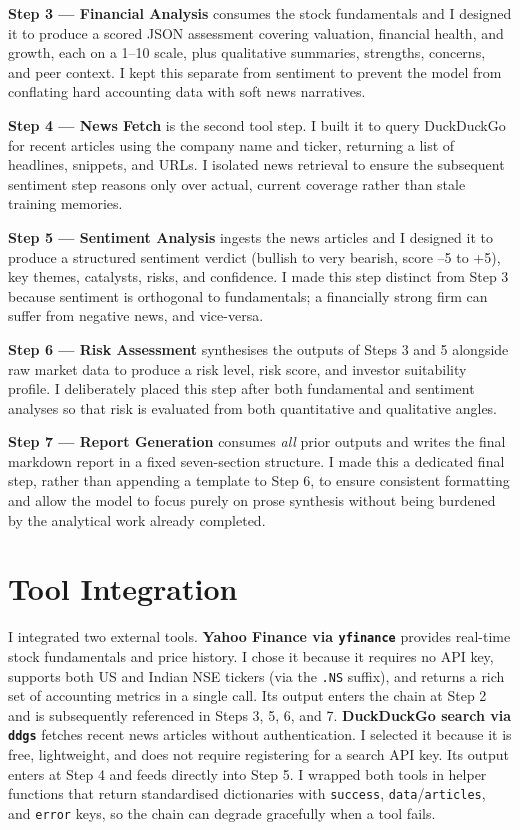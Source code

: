 \documentclass[11pt,a4paper]{article}
\begin{document}
\textbf{Step 3 --- Financial Analysis} consumes the stock fundamentals and I designed it to produce a scored JSON assessment covering valuation, financial health, and growth, each on a 1--10 scale, plus qualitative summaries, strengths, concerns, and peer context. I kept this separate from sentiment to prevent the model from conflating hard accounting data with soft news narratives.

\textbf{Step 4 --- News Fetch} is the second tool step. I built it to query DuckDuckGo for recent articles using the company name and ticker, returning a list of headlines, snippets, and URLs. I isolated news retrieval to ensure the subsequent sentiment step reasons only over actual, current coverage rather than stale training memories.

\textbf{Step 5 --- Sentiment Analysis} ingests the news articles and I designed it to produce a structured sentiment verdict (bullish to very bearish, score --5 to +5), key themes, catalysts, risks, and confidence. I made this step distinct from Step 3 because sentiment is orthogonal to fundamentals; a financially strong firm can suffer from negative news, and vice-versa.

\textbf{Step 6 --- Risk Assessment} synthesises the outputs of Steps 3 and 5 alongside raw market data to produce a risk level, risk score, and investor suitability profile. I deliberately placed this step after both fundamental and sentiment analyses so that risk is evaluated from both quantitative and qualitative angles.

\textbf{Step 7 --- Report Generation} consumes \emph{all} prior outputs and writes the final markdown report in a fixed seven-section structure. I made this a dedicated final step, rather than appending a template to Step 6, to ensure consistent formatting and allow the model to focus purely on prose synthesis without being burdened by the analytical work already completed.

\section{Tool Integration}

I integrated two external tools. \textbf{Yahoo Finance via \texttt{yfinance}} provides real-time stock fundamentals and price history. I chose it because it requires no API key, supports both US and Indian NSE tickers (via the \texttt{.NS} suffix), and returns a rich set of accounting metrics in a single call. Its output enters the chain at Step 2 and is subsequently referenced in Steps 3, 5, 6, and 7. \textbf{DuckDuckGo search via \texttt{ddgs}} fetches recent news articles without authentication. I selected it because it is free, lightweight, and does not require registering for a search API key. Its output enters at Step 4 and feeds directly into Step 5. I wrapped both tools in helper functions that return standardised dictionaries with \texttt{success}, \texttt{data}/\texttt{articles}, and \texttt{error} keys, so the chain can degrade gracefully when a tool fails.
\end{document}
